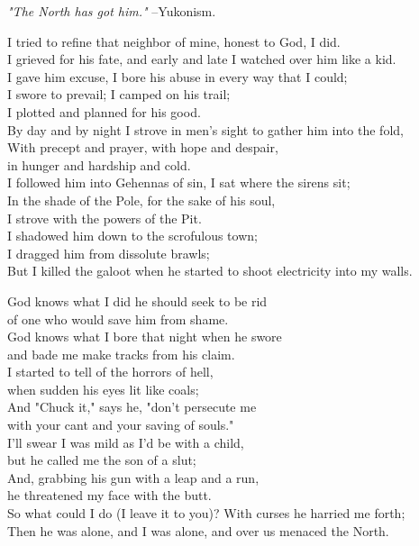 
\begin{poemblock}
\textit{"The North has got him."} --Yukonism.

I tried to refine that neighbor of mine, honest to God, I did.\\
I grieved for his fate, and early and late I watched over him like a kid.\\
I gave him excuse, I bore his abuse in every way that I could;\\
I swore to prevail; I camped on his trail;\\
\idt I plotted and planned for his good.\\
By day and by night I strove in men's sight to gather him into the fold,\\
With precept and prayer, with hope and despair,\\
\idt in hunger and hardship and cold.\\
I followed him into Gehennas of sin, I sat where the sirens sit;\\
In the shade of the Pole, for the sake of his soul,\\
\idt I strove with the powers of the Pit.\\
I shadowed him down to the scrofulous town;\\
\idt I dragged him from dissolute brawls;\\
But I killed the galoot when he started to shoot electricity into my walls.

God knows what I did he should seek to be rid\\
\idt of one who would save him from shame.\\
God knows what I bore that night when he swore\\
\idt and bade me make tracks from his claim.\\
I started to tell of the horrors of hell,\\
\idt when sudden his eyes lit like coals;\\
And "Chuck it," says he, "don't persecute me\\
\idt with your cant and your saving of souls."\\
I'll swear I was mild as I'd be with a child,\\
\idt but he called me the son of a slut;\\
And, grabbing his gun with a leap and a run,\\
\idt he threatened my face with the butt.\\
So what could I do (I leave it to you)?  With curses he harried me forth;\\
Then he was alone, and I was alone, and over us menaced the North.


\end{poemblock}

